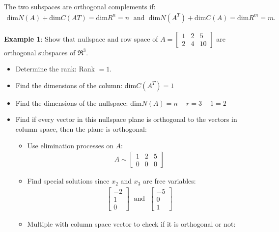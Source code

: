 \documentclass[10pt,a4paper]{article}
\begin{document}
The two subspaces are orthogonal complements if:
\begin{align*}
    \text{dim}N(A)+ \text{dim}C(A T ) = \text{dim} R^n = n \; \text{ and } \;  \text{dim}N(A^T)+\text{dim}C(A) = \text{dim}R^m = m.
\end{align*}



\pagebreak

\textbf{Example 1}: Show that nullspace and row space of $A = \begin{bmatrix}
    1 & 2& 5\\
    2&4&10
\end{bmatrix}$ are orthogonal subspaces of $\Re^3$.

\begin{itemize}
    \item Determine the rank: Rank $= 1$.
    \item Find the dimensions of the column: dim$C(A^T) = 1$
    \item Find the dimensions of the nullspace: dim$N(A) = n-r = 3-1 = 2$
    \item Find if every vector in this nullspace plane is orthogonal to the vectors in column space,
    then the plane is orthogonal:
    \begin{itemize}
        \item Use elimination processes on $A$:
        \begin{align*}
            A \sim \begin{bmatrix}
                1&2&5 \\
                0&0&0
            \end{bmatrix}
        \end{align*}
        \item Find special solutions since $x_2$ and $x_3$ are free variables: 
        \begin{align*}
            \begin{bmatrix}
                -2\\
                1\\
                0
            \end{bmatrix} \; \text{ and } \;
            \begin{bmatrix}
                -5 \\
                0 \\
                1
            \end{bmatrix}
        \end{align*}
        \item Multiple with column space vector to check if it is orthogonal or not:

\end{itemize}
\end{itemize}
\end{document}
